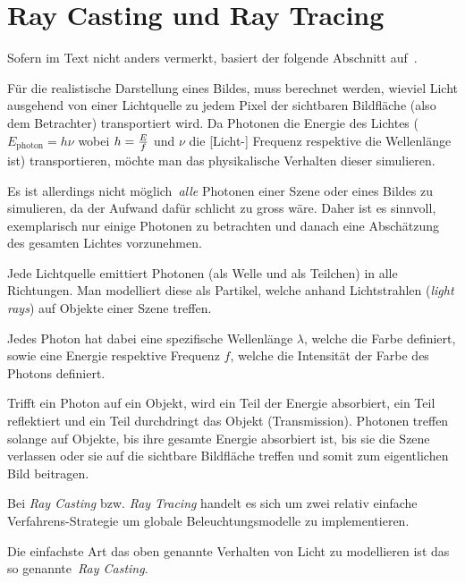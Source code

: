 
\section{Ray Casting und Ray Tracing}
\label{sec:ray_casting_tracing}

Sofern im Text nicht anders vermerkt, basiert der folgende Abschnitt
auf~\cite[Kapitel 15, S. 387ff]{hughes_computer_2013}.

Für die realistische Darstellung eines Bildes, muss berechnet werden,
wieviel Licht ausgehend von einer Lichtquelle zu jedem Pixel der
sichtbaren Bildfläche (also dem Betrachter) transportiert wird. Da
Photonen die Energie des Lichtes ($E_{\text{photon}} = h\nu$ wobei $h =
{E \over f}$ und $\nu$ die [Licht-] Frequenz respektive die Wellenlänge
ist) transportieren, möchte man das physikalische Verhalten dieser
simulieren.

Es ist allerdings nicht möglich~\textit{alle} Photonen einer Szene oder
eines Bildes zu simulieren, da der Aufwand dafür schlicht zu gross wäre.
Daher ist es sinnvoll, exemplarisch nur einige Photonen zu betrachten
und danach eine Abschätzung des gesamten Lichtes vorzunehmen.

Jede Lichtquelle emittiert Photonen (als Welle und als Teilchen) in alle
Richtungen. Man modelliert diese als Partikel, welche anhand
Lichtstrahlen (\textit{light rays}) auf Objekte einer Szene treffen.

Jedes Photon hat dabei eine spezifische Wellenlänge $\lambda{}$, welche
die Farbe definiert, sowie eine Energie respektive Frequenz $f$, welche
die Intensität der Farbe des Photons definiert.

Trifft ein Photon auf ein Objekt, wird ein Teil der Energie absorbiert,
ein Teil reflektiert und ein Teil durchdringt das Objekt (Transmission).
Photonen treffen solange auf Objekte, bis ihre gesamte Energie
absorbiert ist, bis sie die Szene verlassen oder sie auf die sichtbare
Bildfläche treffen und somit zum eigentlichen Bild beitragen.

Bei \textit{Ray Casting} bzw. \textit{Ray Tracing} handelt es sich um
zwei relativ einfache Verfahrens-Strategie um globale Beleuchtungsmodelle zu
implementieren.

Die einfachste Art das oben genannte Verhalten von Licht zu modellieren
ist das so genannte~\textit{Ray Casting}.



